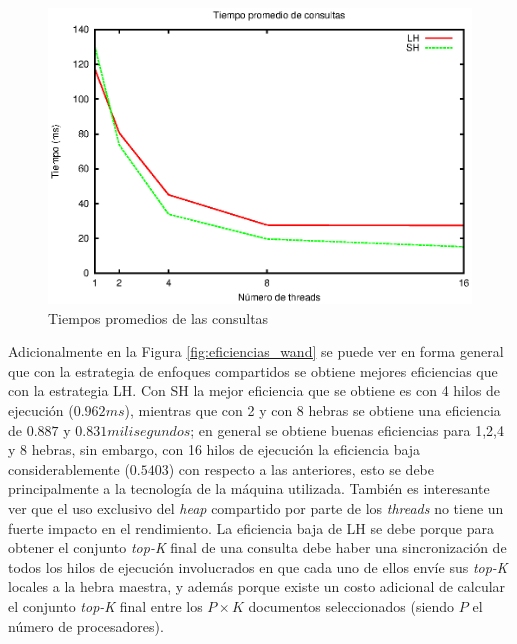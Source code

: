 \begin{figure}[!ht]
\centering
\includegraphics[scale=.75]{images/tiempos_wand.eps}
\caption{Tiempos promedios de las consultas}
\label{fig:tiempos_wand}
\end{figure}

Adicionalmente en la Figura \ref{fig:eficiencias_wand} se puede ver en forma general que con la estrategia de enfoques compartidos se obtiene mejores eficiencias que con la estrategia LH. Con SH la mejor eficiencia que se obtiene es con 4 hilos de ejecución ($0.962 ms$), mientras que con 2 y con 8 hebras se obtiene una eficiencia de $0.887$ y $0.831 milisegundos$; en general se obtiene buenas eficiencias para 1,2,4 y 8 hebras, sin embargo, con 16 hilos de ejecución la eficiencia baja considerablemente ($0.5403$) con respecto a las anteriores, esto se debe principalmente a la tecnología  de la máquina utilizada. También es interesante ver que el uso exclusivo del \textit{heap} compartido por parte de los \textit{threads} no tiene un fuerte impacto en el rendimiento. La eficiencia baja de LH se debe porque para obtener el conjunto \textit{top-K} final de una consulta debe haber una sincronización de todos los hilos de ejecución involucrados en que cada uno de ellos envíe sus \textit{top-K} locales a la hebra maestra, y además porque existe un costo adicional de calcular el conjunto \textit{top-K} final entre los $P \times K$ documentos seleccionados (siendo $P$ el número de procesadores). 
                     

